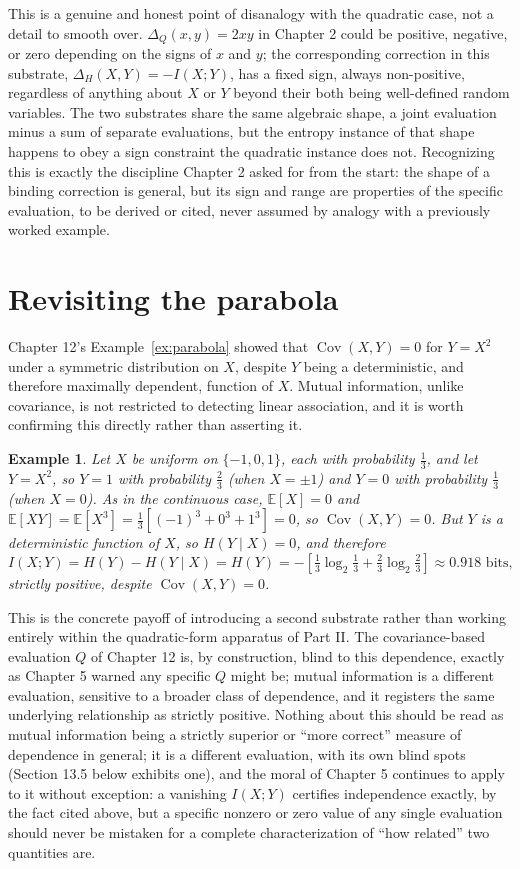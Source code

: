 \documentclass[11pt]{book}
\newtheorem{example}[theorem]{Example}
\begin{document}
This is a genuine and honest point of disanalogy with the quadratic case, not a detail to smooth over. $\Delta_Q(x,y)=2xy$ in Chapter 2 could be positive, negative, or zero depending on the signs of $x$ and $y$; the corresponding correction in this substrate, $\Delta_H(X,Y)=-I(X;Y)$, has a fixed sign, always non-positive, regardless of anything about $X$ or $Y$ beyond their both being well-defined random variables. The two substrates share the same algebraic shape, a joint evaluation minus a sum of separate evaluations, but the entropy instance of that shape happens to obey a sign constraint the quadratic instance does not. Recognizing this is exactly the discipline Chapter 2 asked for from the start: the shape of a binding correction is general, but its sign and range are properties of the specific evaluation, to be derived or cited, never assumed by analogy with a previously worked example.

\section{Revisiting the parabola}

Chapter 12's Example~\ref{ex:parabola} showed that $\operatorname{Cov}(X,Y)=0$ for $Y=X^2$ under a symmetric distribution on $X$, despite $Y$ being a deterministic, and therefore maximally dependent, function of $X$. Mutual information, unlike covariance, is not restricted to detecting linear association, and it is worth confirming this directly rather than asserting it.

\begin{example}
\label{ex:parabola-mi}
Let $X$ be uniform on $\{-1,0,1\}$, each with probability $\tfrac13$, and let $Y=X^2$, so $Y=1$ with probability $\tfrac23$ (when $X=\pm1$) and $Y=0$ with probability $\tfrac13$ (when $X=0$). As in the continuous case, $\mathbb E[X]=0$ and $\mathbb E[XY]=\mathbb E[X^3]=\tfrac13[(-1)^3+0^3+1^3]=0$, so $\operatorname{Cov}(X,Y)=0$. But $Y$ is a deterministic function of $X$, so $H(Y\mid X)=0$, and therefore
\[
I(X;Y) = H(Y) - H(Y\mid X) = H(Y) = -\left[\tfrac13\log_2\tfrac13 + \tfrac23\log_2\tfrac23\right] \approx 0.918 \text{ bits},
\]
strictly positive, despite $\operatorname{Cov}(X,Y)=0$.
\end{example}

This is the concrete payoff of introducing a second substrate rather than working entirely within the quadratic-form apparatus of Part II. The covariance-based evaluation $Q$ of Chapter 12 is, by construction, blind to this dependence, exactly as Chapter 5 warned any specific $Q$ might be; mutual information is a different evaluation, sensitive to a broader class of dependence, and it registers the same underlying relationship as strictly positive. Nothing about this should be read as mutual information being a strictly superior or ``more correct'' measure of dependence in general; it is a different evaluation, with its own blind spots (Section 13.5 below exhibits one), and the moral of Chapter 5 continues to apply to it without exception: a vanishing $I(X;Y)$ certifies independence exactly, by the fact cited above, but a specific nonzero or zero value of any single evaluation should never be mistaken for a complete characterization of ``how related'' two quantities are.
\end{document}
